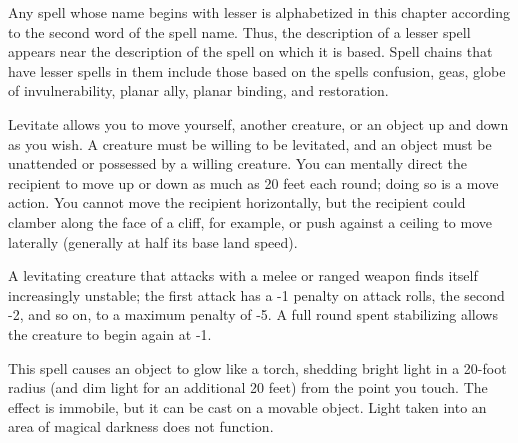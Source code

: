 \begin{multicols}{2}
\begin{small}
\noindent Any spell whose name begins with lesser is alphabetized in this chapter according to the second word of the spell name. Thus, the description of a lesser spell appears near the description of the spell on which it is based. Spell chains that have lesser spells in them include those based on the spells confusion, geas, globe of invulnerability, planar ally, planar binding, and restoration.

\noindent Levitate allows you to move yourself, another creature, or an object up and down as you wish. A creature must be willing to be levitated, and an object must be unattended or possessed by a willing creature. You can mentally direct the recipient to move up or down as much as 20 feet each round; doing so is a move action. You cannot move the recipient horizontally, but the recipient could clamber along the face of a cliff, for example, or push against a ceiling to move laterally (generally at half its base land speed).

\smallskip\noindent A levitating creature that attacks with a melee or ranged weapon finds itself increasingly unstable; the first attack has a -1 penalty on attack rolls, the second -2, and so on, to a maximum penalty of -5. A full round spent stabilizing allows the creature to begin again at -1.


\noindent This spell causes an object to glow like a torch, shedding bright light in a 20-foot radius (and dim light for an additional 20 feet) from the point you touch. The effect is immobile, but it can be cast on a movable object. Light taken into an area of magical darkness does not function.


\end{small}
\end{multicols}
